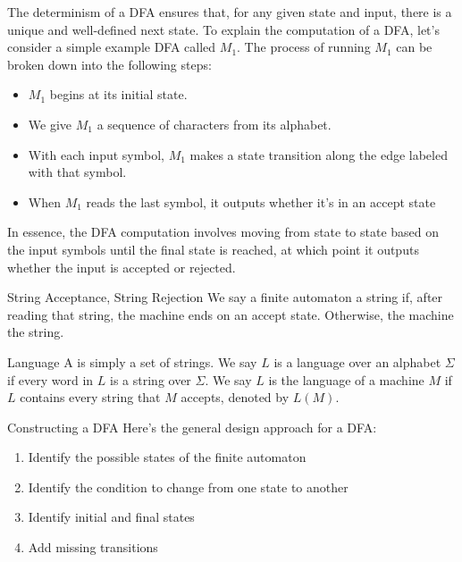 The determinism of a DFA ensures that, for any given state and input, there is a unique and well-defined next state. To explain the computation of a DFA, let's consider a simple example DFA called $M_1$. The process of running $M_1$ can be broken down into the following steps:
\begin{itemize}[noitemsep]
    \item $M_1$ begins at its initial state.
    \item We give $M_1$ a sequence of characters from its alphabet.
    \item With each input symbol, $M_1$ makes a state transition along the edge labeled with that symbol.
    \item When $M_1$ reads the last symbol, it outputs whether it's in an accept state
\end{itemize}

In essence, the DFA computation involves moving from state to state based on the input symbols until the final state is reached, at which point it outputs whether the input is accepted or rejected.

\begin{dfnbox}{String Acceptance, String Rejection}{}
    We say a finite automaton  a string if, after reading that string, the machine ends on an accept state. Otherwise, the machine  the string.
\end{dfnbox}

\begin{dfnbox}{Language }{}
    A  is simply a set of strings. We say $L$ is a language over an alphabet $\Sigma$ if every word in $L$ is a string over $\Sigma$. We say $L$ is the language of a machine $M$ if $L$ contains every string that $M$ accepts, denoted by $L(M)$.
\end{dfnbox}

\begin{tecbox}{Constructing a DFA}{}
    Here's the general design approach for a DFA:
    \begin{enumerate}[noitemsep]
        \item Identify the possible states of the finite automaton
        \item Identify the condition to change from one state to another
        \item Identify initial and final states
        \item Add missing transitions
    \end{enumerate}
\end{tecbox}

